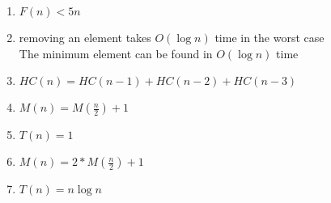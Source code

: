 \documentclass[11pt]{article}
\begin{document}
\begin{enumerate}
    \item $F(n) < 5n$
    \item 
    removing an element takes $O(\log{n})$ time in the worst case\\
    The minimum element can be found in $O(\log{n})$ time
    \item $HC(n) = HC(n-1) + HC(n-2) + HC(n-3)$
    \item $M(n) = M(\frac{n}{2}) + 1$
    \item $T(n) = 1$
    \item $M(n) = 2 * M(\frac{n}{2}) + 1$
    \item $T(n) = n \log{n}$
\end{enumerate}
\end{document}
